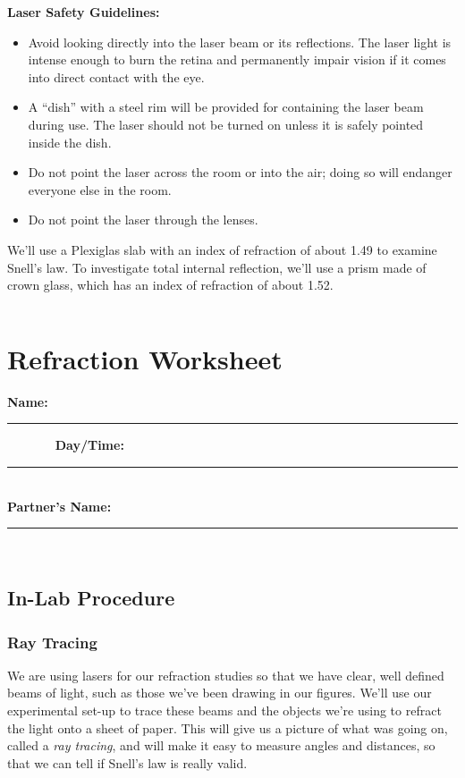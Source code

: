 \begin{center}
{\bf Laser Safety Guidelines:}
\end{center}

\begin{itemize}

\item Avoid looking directly into the laser beam or its reflections.  The laser
light is intense enough to burn the retina and permanently impair vision if 
it comes into direct contact with the eye. 

\item A ``dish'' with a steel rim will be provided for containing the laser 
beam during use. The laser should not be turned on unless it is safely pointed 
inside the dish.

\item Do not point the laser across the room or into the air; doing so will 
endanger everyone else in the room.

\item Do not point the laser through the lenses.

\end{itemize}
We'll use a Plexiglas slab with an index of refraction of about 1.49 to 
examine Snell's law. To investigate total internal reflection, we'll use a
prism made of crown glass, which has an index of refraction of about 1.52. 


\vfill
\pagebreak
$$
$$
\vfill
\clearpage
\newpage

\renewcommand{\thesection}{\thechapter.W}

\section{Refraction Worksheet}
{\bf \Large Name:}~ \rule{5cm}{.1mm}~~~~~~~
{\bf \Large Day/Time:}~\rule{3cm}{.1mm}\\
{\bf \Large Partner's Name:}~\rule{6cm}{.1mm}\\
\subsection{In-Lab Procedure}

\subsubsection{Ray Tracing}
\label{sec:opt:raytrace}

We are using lasers for our refraction studies so that we have clear, well 
defined beams of light, such as those we've been drawing in our figures. 
We'll use our experimental set-up to trace these beams and the objects we're 
using to refract the light onto a sheet of paper.  This will give us a picture
of what was going on, called a {\it ray tracing}, and will make it easy to 
measure angles and distances, so that we can tell if Snell's law is really 
valid. \\

